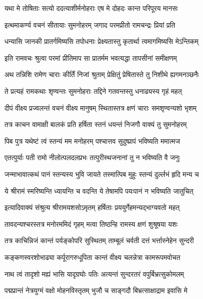 \twolineshloka
{यथा मे तोषिताः सत्यो ददत्याशीर्मनोहराः}
{एष मे दोहदः कान्त परिपूरय मानसः}%

\twolineshloka
{इत्थमाकर्ण्य वचनं सीतायाः सुमनोहरम्}
{जगाद परमप्रीतो रामचन्द्रः प्रियां प्रति}%

\twolineshloka
{धन्यासि जानकी प्रातर्गमिष्यसि तपोधनाः}
{प्रेक्ष्यतास्तु कृतार्था त्वमागमिष्यसि मेऽन्तिकम्}%

\twolineshloka
{इति रामवचः श्रुत्वा परमां प्रीतिमाप सा}
{प्रातर्मम भवत्यद्धा तापसीनां समीक्षणम्}%

\twolineshloka
{अथ तन्निशि रामेण चाराः कीर्तिं निजां श्रुताम्}
{प्रेक्षितुं प्रेषितास्ते तु निशीथे ह्यगमनञ्छनैः}%

\twolineshloka
{ते प्रत्यहं रामकथाः शृण्वन्तः सुमनोहराः}
{तद्दिने गतवन्तस्तु धनाढ्यस्य गृहं महत्}%

\twolineshloka
{दीपं वीक्ष्य प्रज्वलन्तं वचनं वीक्ष्य मानुषम्}
{स्थितास्तत्र क्षणं चाराः समशृण्वन्यशो भृशम्}%

\twolineshloka
{तत्र काचन वामाक्षी बालकं प्रति हर्षिता}
{स्तनं धयन्तं निजगौ वाक्यं तु सुमनोहरम्}%

\twolineshloka
{पिब पुत्र यथेष्टं त्वं स्तन्यं मम मनोहरम्}
{पश्चात्तव सुदुष्प्रापं भविष्यति ममात्मज}%

\twolineshloka
{एतत्पुर्याः पती रामो नीलोत्पलदलप्रभः}
{तत्पुरीस्थजनानां तु न भविष्यति वै जनुः}%

\twolineshloka
{जन्माभावात्कथं पानं स्तन्यस्य भुवि जायते}
{तस्मात्पिब मुहुः स्तन्यं दुर्ल्लभं हृदि मन्य च}%

\twolineshloka
{ये श्रीरामं स्मरिष्यन्ति ध्यायन्ति च वदन्ति ये}
{तेषामपि पयःपानं न भविष्यति जातुचित्}%

\twolineshloka
{इत्यादिवाक्यं संश्रुत्य श्रीरामयशसोऽमृतम्}
{हर्षिताः प्रययुर्गेहमन्यद्भाग्यवतो महत्}%

\twolineshloka
{तावदन्यश्चरस्तत्र मनोरममिदं गृहम्}
{मत्वा तिष्ठन्हि रामस्य क्षणं शुश्रूषया यशः}%

\twolineshloka
{तत्र काचिन्निजं कान्तं पर्यङ्कोपरि सुस्थितम्}
{ताम्बूलं चर्वती दत्तं भर्त्तास्नेहेन सुन्दरी}%

\twolineshloka
{कङ्कणस्वरशोभाढ्या कर्पूरागरुधूपिता}
{कान्तं वीक्ष्य चलन्नेत्रा कामरूपमवोचत}%

\twolineshloka
{नाथ त्वं तादृशो मह्यं भासि यादृग्रघोः पतिः}
{अत्यन्तं सुन्दरतरं वपुर्बिभ्रत्सुकोमलम्}%

\twolineshloka
{पद्मप्रान्तं नेत्रयुग्मं वक्षो मोहनविस्तृतम्}
{भुजौ च साङ्गदौ बिभ्रत्साक्षाद्राम इवासि मे}%

